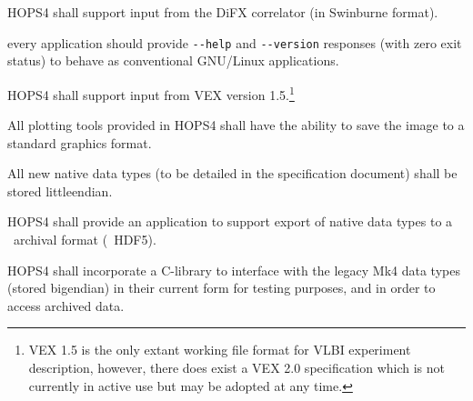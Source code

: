 \begin{description}

 HOPS4 shall support input from the DiFX \cite{deller2007difx,deller2011difx} correlator (in Swinburne format).

 every application should provide
    \verb+--help+ and \verb+--version+ responses (with zero exit status)
    to behave as conventional \acs{GNU/Linux} applications.

 HOPS4 shall support input from \acs{VEX} version 1.5.\footnote{\acs{VEX} 1.5
is the only extant working file format for VLBI experiment description, however, there does
exist a VEX 2.0 specification which is not currently in active use but may be adopted at any time.}


 All plotting tools provided in HOPS4 shall have the ability to save the image to 
a standard graphics format.


 All new native data types (to be detailed in the specification document)
shall be stored \acs{littleendian}.

 HOPS4 shall provide an application to support export of native
data types to a \TBD~archival format (\eg~HDF5).

 HOPS4 shall incorporate a C-library to interface with the legacy 
\acs{Mk4} data types (stored \acs{bigendian}) in their current form for 
testing purposes, and in order to access archived data. 

\end{description}



